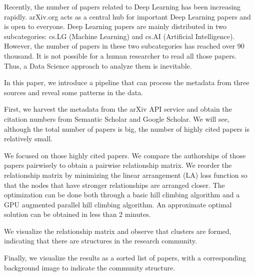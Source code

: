 
Recently, the number of papers related to Deep Learning has been increasing rapidly.
arXiv.org acts as a central hub for important Deep Learning papers and is open to everyone.
Deep Learning papers are mainly distributed in two subcategories: cs.LG (Machine Learning) and cs.AI (Artificial Intelligence).
However, the number of papers in these two subcategories has reached over 90 thousand.
It is not possible for a human researcher to read all those papers.
Thus, a Data Science approach to analyze them is inevitable.

In this paper, we introduce a pipeline that can process the metadata from three sources and reveal some patterns in the data.

First, we harvest the metadata from the arXiv API service and obtain the citation numbers from Semantic Scholar and Google Scholar.
We will see, although the total number of papers is big, the number of highly cited papers is relatively small.

We focused on those highly cited papers.
We compare the authorships of those papers pairwisely to obtain a pairwise relationship matrix.
We reorder the relationship matrix by minimizing the linear arrangement (LA) loss function so that the nodes that have stronger relationships are arranged closer.
The optimization can be done both through a basic hill climbing algorithm and a GPU augmented parallel hill climbing algorithm.
An approximate optimal solution can be obtained in less than 2 minutes.

We visualize the relationship matrix and observe that clusters are formed, indicating that there are structures in the research community.

Finally, we visualize the results as a sorted list of papers, with a corresponding background image to indicate the community structure.

